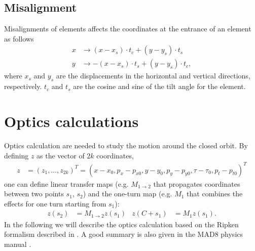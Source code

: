 \documentclass[english]{article}
\begin{document}
\subsection{Misalignment}

Misalignments of elements affects the coordinates at the entrance of an
element as follows
\begin{align}
    x &\to (x-x_s)\cdot t_c + (y-y_s)\cdot t_s \\
    y &\to -(x-x_s)\cdot t_s + (y-y_s)\cdot t_c,
\end{align}
where $x_s$ and $y_s$ are the displacements in the horizontal and vertical
directions, respectively. $t_c$ and $t_s$ are the cosine and sine of the tilt
angle for the element.

\section{Optics calculations}
\label{opt}
Optics calculation are needed to study the motion around the closed orbit. By defining $z$ as the vector of $2 k$ coordinates,  
\begin{align}\label{opt:eqn:1}
z&=(z_1,\ldots,z_{2k})^T=(x-x_0,p_x-p_{x0},y-y_0,p_y-p_{y0},\tau-\tau_0,p_t-p_{t0})^T
\end{align}
one can define linear transfer maps (e.g. $M_{1\to 2}$ that propagates coordinates between two points $s_1$, $s_2$) and the one-turn map (e.g. $M_1$ that combines the effects for one turn starting from $s_1$):
\begin{align}\label{opt:eqn:2}
z(s_2)&= M_{1\to 2} z(s_1) & z(C+s_1) &= M_1 z(s_1).
\end{align}
In the following we will describe the optics calculation based on the Ripken formalism described in \cite{willeke88}. A good summary is also given in the MAD8 physics manual \cite{mad8phys}.
\end{document}
